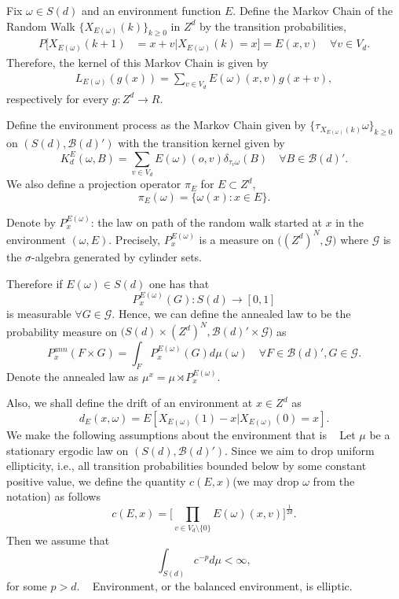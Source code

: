 \documentclass[final]{aomart}
\def\mathscr#1{#1}%
\def\mathbb#1{#1}%
\theoremstyle{plain}
\theoremstyle{definition}
\theoremstyle{remark}
\begin{document}
Fix $\omega \in \mathscr{S}(d)$ and an environment function $\mathscr{E}$. Define the Markov Chain of the Random Walk $\{X_{\mathscr{E}(\omega)}(k) \}_{k\geq 0} $ in $\mathbb{Z}^d$ by the transition probabilities, \begin{align*}
\mathbb{P}[X_{\mathscr{E}(\omega)} (k+1) 
&= x+ v | X_{\mathscr{E}(\omega)}(k) = x] = \mathscr{E}(x,v) \quad\forall v \in V_d
.\end{align*}
Therefore, the kernel of this Markov Chain is given by \begin{align*}
L_{\mathscr{E}(\omega)}(g(x)) = \sum_{v \in V_d} \mathscr{E}(\omega)(x,v) g(x+v),
\end{align*}
respectively for every $g: \mathbb{Z}^d \to \mathbb{R}$. 

Define the environment process as the Markov Chain given by  $\{\tau_{X_{\mathscr{E}(\omega)}(k)} \omega \}_{k \geq 0}$ on $(\mathscr{S}(d), \mathcal{B}(d)')$  with the transition kernel given by \[
K_d^{\mathscr{E}}( \omega , B) =\sum_{v \in V_d} {\mathscr{E}(\omega)}(o,v) \delta_{\tau_v \omega}(B)  \quad\forall B \in \mathcal{B}(d)'.
\]
We also define a projection operator $\pi_E$ for $E\subset \mathbb{Z}^d$,
\[
\pi_E(\omega) = \{ \omega(x): x \in E \}.
\]
 
Denote by $\mathbb{P}^{\mathscr{E}({\omega})}_x$: the law on path of the random walk started at $x$ in the environment $(\omega, \mathscr{E})$. Precisely, $\mathbb{P}^{{\mathscr{E}(\omega)}}_x$ is a measure on $((\mathbb{Z}^d)^\mathbb{N}, \mathcal{G)}$ where $\mathcal{G}$ is the $\sigma$-algebra generated by cylinder sets. 
 
Therefore if ${\mathscr{E}(\omega)} \in \mathscr{S}(d)$ one has that \[
\mathbb{P}^{{\mathscr{E}(\omega)}}_x(G): \mathscr{S}(d) \to [0,1]
\]
is measurable $\forall G \in \mathcal{G}$. Hence, we can define the annealed law to be the probability measure on $(\mathscr{S}(d) \times (\mathbb{Z}^d)^{\mathbb{N}}, \mathcal{B}(d)' \times \mathcal{G)}$ as \[
\mathbb{P}^{ann}_x(F \times G) = \int_{F} \mathbb{P}_x^{{\mathscr{E}(\omega)}}(G) d\mu(\omega) \quad\forall F \in \mathcal{B}(d)' , G \in \mathcal{G} .
\]
Denote the annealed law as $\mu^x =\mu \rtimes {\mathbb{P}}_x^{{\mathscr{E}(\omega)}}$. 

Also, we shall define the drift of an environment at $x \in \mathbb{Z}^d$ as \[
d_{\mathscr{E}}(x, \omega) = E[X_{{\mathscr{E}(\omega)}}(1) - x | X_{{\mathscr{E}(\omega)}}(0) =x].
\]
We make the following assumptions about the environment that is
\assumption{}~\label{assump:1} Let $\mu$ be a stationary ergodic law on $(\mathscr{S}(d), \mathcal{B}(d)')$. Since we aim to drop uniform ellipticity, i.e., all transition probabilities bounded below by some constant positive value, we define the quantity $c(\mathscr{E}, x)$(we may drop $\omega$ from the notation) as follows\[
c(\mathscr{E},x) = \Big[ \prod_{v \in V_d\setminus\{0\}} \mathscr{E}(\omega)(x,v)\Big] ^{\frac{1}{2d}}.
\]
Then we assume that \[
\int_{\mathscr{S}(d)} c^{-p} d\mu <\infty,
\] 
for some $p >d$. 
\assumption{}~\label{assump:2} 
Environment, or the balanced environment, is elliptic. 
\end{document}
